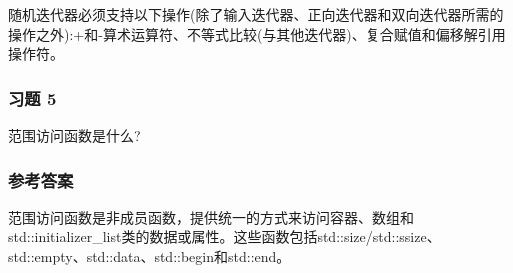 随机迭代器必须支持以下操作(除了输入迭代器、正向迭代器和双向迭代器所需的操作之外):+和-算术运算符、不等式比较(与其他迭代器)、复合赋值和偏移解引用操作符。

\subsubsection{习题 5}

范围访问函数是什么?

\subsubsection{参考答案}

范围访问函数是非成员函数，提供统一的方式来访问容器、数组和std::initializer\_list类的数据或属性。这些函数包括std::size/std::ssize、std::empty、std::data、std::begin和std::end。













